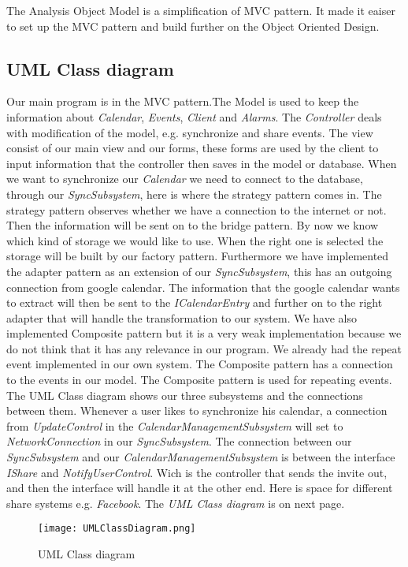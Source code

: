 The Analysis Object Model is a simplification of MVC pattern. It made it eaiser to set up the MVC pattern and build further on the Object Oriented Design. 

\subsection{UML Class diagram}
Our main program is in the MVC pattern.The Model is used to keep the information about \textit{Calendar}, \textit{Events}, \textit{Client} and \textit{Alarms}. The \textit{Controller} deals with modification of the model, e.g. synchronize and share events. The view consist of our main view and our forms, these forms are used by the client to input information that the controller then saves in the model or database.
When we want to synchronize our \textit{Calendar} we need to connect to the database, through our \textit{SyncSubsystem}, here is where the strategy pattern comes in. The strategy pattern observes whether we have a connection to the internet or not. Then the information will be sent on to the bridge pattern. By now we know which kind of storage we would like to use. When the right one is selected the storage will be built by our factory pattern. 
Furthermore we have implemented the adapter pattern as an extension of our \textit{SyncSubsystem}, this has an outgoing connection from google calendar. The information that the google calendar wants to extract will then be sent to the \textit{ICalendarEntry} and further on to the right adapter that will handle the transformation to our system. 
We have also implemented Composite pattern but it is a very weak implementation because we do not think that it has any relevance in our program. We already had the repeat event implemented in our own system. The Composite pattern has a connection to the events in our model. The Composite pattern is used for repeating events.
\newline
The UML Class diagram shows our three subsystems and the connections between them. Whenever a user likes to synchronize his calendar, a connection from \textit{UpdateControl} in the \textit{CalendarManagementSubsystem} will set to \textit{NetworkConnection} in our \textit{SyncSubsystem}.
The connection between our \textit{SyncSubsystem} and our \textit{CalendarManagementSubsystem} is between the interface \textit{IShare} and \textit{NotifyUserControl}. Wich is the controller that sends the invite out, and then the interface will handle it at the other end. Here is space for different share systems e.g. \textit{Facebook}. 
\newline
\newline
The \textit{UML Class diagram} is on next page.

\begin{sidewaysfigure}
\centering
\texttt{[image: UMLClassDiagram.png]}
\caption{UML Class diagram \label{img:UMLClassDiagram}}
\end{sidewaysfigure}
